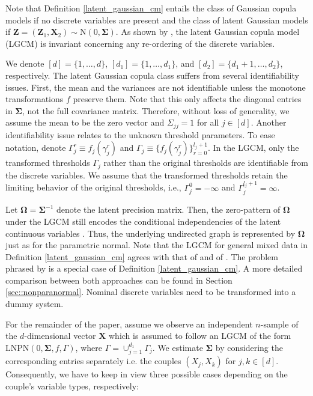 Note that Definition \ref{latent_gaussian_cm} entails the class of Gaussian copula models if no discrete variables are present and the class of latent Gaussian models if $\mathbf{Z} = (\mathbf{Z}_1, \mathbf{X}_2) \sim \text{N}(0, \mathbf{\Sigma})$. As shown by \citet{Fan17}, the latent Gaussian copula model (LGCM) is invariant concerning any re-ordering of the discrete variables.

We denote \([d] = \{1,\dots,d\}\), \([d_1] = \{1,\dots,d_1\}\), and \([d_2] = \{d_1 +1, \dots, d_2\}\), respectively. The latent Gaussian copula class suffers from several identifiability issues. First, the mean and the variances are not identifiable unless the monotone transformations \(f\) preserve them. Note that this only affects the diagonal entries in \(\mathbf\Sigma\), not the full covariance matrix. Therefore, without loss of generality, we assume the mean to be the zero vector and \(\Sigma_{jj} = 1\) for all \(j \in [d]\). Another identifiability issue relates to the unknown threshold parameters. To ease notation, denote \(\Gamma_j^r \equiv f_j(\gamma_j^r)\) and \(\Gamma_j \equiv \{f_j(\gamma_j^r)\}_{r=0}^{l_j+1}\). In the LGCM, only the transformed thresholds \(\Gamma_j\) rather than the original thresholds are identifiable from the discrete variables. We assume that the transformed thresholds retain the limiting behavior of the original thresholds, i.e., \(\Gamma_{j}^{0} = -\infty\) and \(\Gamma_j^{l_j+1} = \infty\).

Let $\mathbf{\Omega}= \mathbf{\Sigma}^{-1}$ denote the latent precision matrix. Then, the zero-pattern of $\mathbf{\Omega}$ under the LGCM still encodes the conditional independencies of the latent continuous variables \cite{Liu09}. Thus, the underlying undirected graph is represented by $\mathbf{\Omega}$ just as for the parametric normal. Note that the LGCM for general mixed data in Definition \ref{latent_gaussian_cm} agrees with that of \citet{Quan18} and of \citet{Feng19}. The problem phrased by \citet{Fan17} is a special case of  Definition \ref{latent_gaussian_cm}. A more detailed comparison between both approaches can be found in Section \ref{sec::nonparanormal}. Nominal discrete variables need to be transformed into a dummy system.

For the remainder of the paper, assume we observe an independent $n$-sample of the $d$-dimensional vector $\mathbf{X}$ which is assumed to follow an LGCM of the form \(\text{LNPN}(0, \mathbf{\Sigma}, f, \Gamma)\), where \(\Gamma = \cup_{j=1}^{d_1}\Gamma_j\). We estimate $\mathbf{\Sigma}$ by considering the corresponding entries separately i.e. the couples $(X_j, X_k)$ for \(j,k \in [d]\). Consequently, we have to keep in view three possible cases depending on the couple's variable types, respectively:

